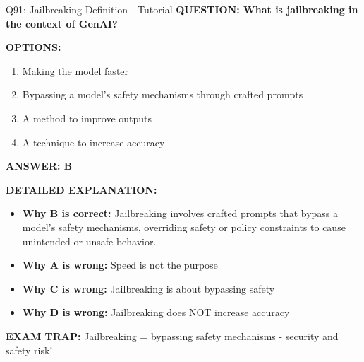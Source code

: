 \documentclass[8pt]{beamer}
\begin{document}
	\begin{frame}{Q91: Jailbreaking Definition - Tutorial}
		\fontsize{6.5}{7.5}\selectfont
		\textbf{QUESTION: What is jailbreaking in the context of GenAI?}
		
		\vspace{0.1cm}
		\textbf{OPTIONS:}
		\begin{enumerate}
			\item Making the model faster
			\item Bypassing a model's safety mechanisms through crafted prompts
			\item A method to improve outputs
			\item A technique to increase accuracy
		\end{enumerate}
		
		\vspace{0.1cm}
		\textcolor{myblue}{\textbf{ANSWER: B}}
		
		\vspace{0.1cm}
		\textbf{DETAILED EXPLANATION:}
		\begin{itemize}
			\item \textbf{Why B is correct:} Jailbreaking involves crafted prompts that bypass a model's safety mechanisms, overriding safety or policy constraints to cause unintended or unsafe behavior.
			\item \textbf{Why A is wrong:} Speed is not the purpose
			\item \textbf{Why C is wrong:} Jailbreaking is about bypassing safety
			\item \textbf{Why D is wrong:} Jailbreaking does NOT increase accuracy
		\end{itemize}
		
		\textcolor{myred}{\textbf{EXAM TRAP:}} Jailbreaking = \textcolor{myblue}{bypassing safety mechanisms} - security and safety risk!
	\end{frame}
	
\end{document}
